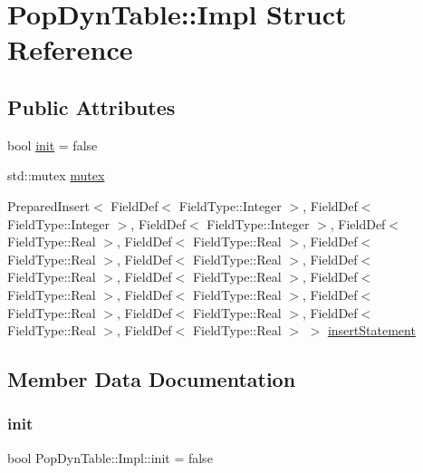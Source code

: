\hypertarget{struct_pop_dyn_table_1_1_impl}{}\section{Pop\+Dyn\+Table\+::Impl Struct Reference}
\label{struct_pop_dyn_table_1_1_impl}
\subsection*{Public Attributes}
\begin{DoxyCompactItemize}
\item 
bool \mbox{\hyperlink{struct_pop_dyn_table_1_1_impl_ad0b35ebe94dbb91cec84ab50b8f25b06}{init}} = false
\item 
std\+::mutex \mbox{\hyperlink{struct_pop_dyn_table_1_1_impl_a3941fa343b3062e5a875edb5ad863954}{mutex}}
\item 
Prepared\+Insert$<$ Field\+Def$<$ Field\+Type\+::\+Integer $>$, Field\+Def$<$ Field\+Type\+::\+Integer $>$, Field\+Def$<$ Field\+Type\+::\+Integer $>$, Field\+Def$<$ Field\+Type\+::\+Real $>$, Field\+Def$<$ Field\+Type\+::\+Real $>$, Field\+Def$<$ Field\+Type\+::\+Real $>$, Field\+Def$<$ Field\+Type\+::\+Real $>$, Field\+Def$<$ Field\+Type\+::\+Real $>$, Field\+Def$<$ Field\+Type\+::\+Real $>$, Field\+Def$<$ Field\+Type\+::\+Real $>$, Field\+Def$<$ Field\+Type\+::\+Real $>$, Field\+Def$<$ Field\+Type\+::\+Real $>$, Field\+Def$<$ Field\+Type\+::\+Real $>$, Field\+Def$<$ Field\+Type\+::\+Real $>$, Field\+Def$<$ Field\+Type\+::\+Real $>$ $>$ \mbox{\hyperlink{struct_pop_dyn_table_1_1_impl_aa565c54d00478eb815f0f29d7b628d9f}{insert\+Statement}}
\end{DoxyCompactItemize}


\subsection{Member Data Documentation}
\mbox{\label{struct_pop_dyn_table_1_1_impl_ad0b35ebe94dbb91cec84ab50b8f25b06}} 
\subsubsection{\texorpdfstring{init}{init}}
{\footnotesize\ttfamily bool Pop\+Dyn\+Table\+::\+Impl\+::init = false}

\mbox{\label{struct_pop_dyn_table_1_1_impl_aa565c54d00478eb815f0f29d7b628d9f}} 
